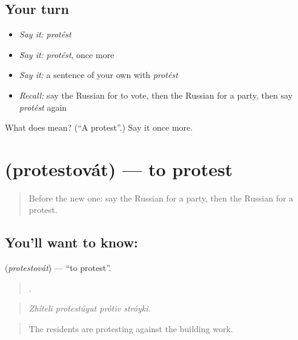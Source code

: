 \subsection*{Your turn}
\begin{itemize}
\raggedright
  \item \emph{Say it:} \emph{protést}
  \item \emph{Say it:} \emph{protést}, once more
  \item \emph{Say it:} a sentence of your own with \emph{protést}
  \item \emph{Recall:} say the Russian for to vote, then the Russian for a party, then say \emph{protést} again
\end{itemize}

\begin{tcolorbox}[breakable,colback=teal!4,colframe=teal!35!black,title={Before you move on}]
What does  mean? (\textquotedblleft{}A protest\textquotedblright{}.) Say it once more.
\end{tcolorbox}
\section[\texorpdfstring{\ru{протестовать} (protestovát)}{протестовать (protestovát)}]{ (protestovát) — to protest}

\label{lesson:RU-C366-protestovat}



\begin{quote}
Before the new one: say the Russian for a party, then the Russian for a protest.
\end{quote}

\subsection*{You'll want to know: }
\textbf{} (\emph{protestovát}) — \textquotedblleft{}to protest\textquotedblright{}.

\begin{quote}
   .
\end{quote}

\begin{quote}
\emph{Zhíteli protestúyut prótiv stróyki.}
\end{quote}

\begin{quote}
The residents are protesting against the building work.
\end{quote}

